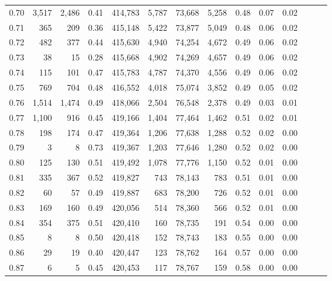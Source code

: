 \begin{tabular}{rrrrrrrrrrrrrr}
0.70 &   3,517 &  2,486 &  0.41 &  414,783 &    5,787 &  73,668 &   5,258 &  0.48 &  0.07 &      0.02 \\
0.71 &     365 &    209 &  0.36 &  415,148 &    5,422 &  73,877 &   5,049 &  0.48 &  0.06 &      0.02 \\
0.72 &     482 &    377 &  0.44 &  415,630 &    4,940 &  74,254 &   4,672 &  0.49 &  0.06 &      0.02 \\
0.73 &      38 &     15 &  0.28 &  415,668 &    4,902 &  74,269 &   4,657 &  0.49 &  0.06 &      0.02 \\
0.74 &     115 &    101 &  0.47 &  415,783 &    4,787 &  74,370 &   4,556 &  0.49 &  0.06 &      0.02 \\
0.75 &     769 &    704 &  0.48 &  416,552 &    4,018 &  75,074 &   3,852 &  0.49 &  0.05 &      0.02 \\
0.76 &   1,514 &  1,474 &  0.49 &  418,066 &    2,504 &  76,548 &   2,378 &  0.49 &  0.03 &      0.01 \\
0.77 &   1,100 &    916 &  0.45 &  419,166 &    1,404 &  77,464 &   1,462 &  0.51 &  0.02 &      0.01 \\
0.78 &     198 &    174 &  0.47 &  419,364 &    1,206 &  77,638 &   1,288 &  0.52 &  0.02 &      0.00 \\
0.79 &       3 &      8 &  0.73 &  419,367 &    1,203 &  77,646 &   1,280 &  0.52 &  0.02 &      0.00 \\
0.80 &     125 &    130 &  0.51 &  419,492 &    1,078 &  77,776 &   1,150 &  0.52 &  0.01 &      0.00 \\
0.81 &     335 &    367 &  0.52 &  419,827 &      743 &  78,143 &     783 &  0.51 &  0.01 &      0.00 \\
0.82 &      60 &     57 &  0.49 &  419,887 &      683 &  78,200 &     726 &  0.52 &  0.01 &      0.00 \\
0.83 &     169 &    160 &  0.49 &  420,056 &      514 &  78,360 &     566 &  0.52 &  0.01 &      0.00 \\
0.84 &     354 &    375 &  0.51 &  420,410 &      160 &  78,735 &     191 &  0.54 &  0.00 &      0.00 \\
0.85 &       8 &      8 &  0.50 &  420,418 &      152 &  78,743 &     183 &  0.55 &  0.00 &      0.00 \\
0.86 &      29 &     19 &  0.40 &  420,447 &      123 &  78,762 &     164 &  0.57 &  0.00 &      0.00 \\
0.87 &       6 &      5 &  0.45 &  420,453 &      117 &  78,767 &     159 &  0.58 &  0.00 &      0.00 \\

\end{tabular}

